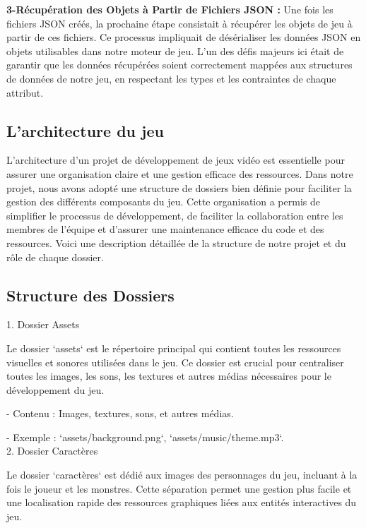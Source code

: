 \textbf{3-Récupération des Objets à Partir de Fichiers JSON :}
Une fois les fichiers JSON créés, la prochaine étape consistait à récupérer les objets de jeu à partir de ces fichiers. 
Ce processus impliquait de désérialiser les données JSON en objets utilisables dans notre moteur de jeu. 
L'un des défis majeurs ici était de garantir que les données récupérées soient correctement mappées aux structures de
données de notre jeu, en respectant les types et les contraintes de chaque attribut.


\subsection{L'architecture du jeu}




L'architecture d'un projet de développement de jeux vidéo est essentielle pour assurer une organisation claire et une gestion efficace des ressources.
 Dans notre projet, nous avons adopté une structure de dossiers bien définie pour faciliter la gestion des différents composants du jeu. Cette organisation 
 a permis de simplifier le processus de développement, de faciliter la collaboration entre les membres de l'équipe et d'assurer une maintenance efficace du code
  et des ressources. Voici une description détaillée de la structure de notre projet et du rôle de chaque dossier.

\subsection*{Structure des Dossiers}

1. Dossier Assets

   Le dossier `assets` est le répertoire principal qui contient toutes les ressources visuelles et sonores utilisées dans le jeu. 
   Ce dossier est crucial pour centraliser toutes les images, les sons, les textures et autres médias nécessaires pour le développement du jeu.

   - Contenu : Images, textures, sons, et autres médias.

   - Exemple : `assets/background.png`, `assets/music/theme.mp3`.
\\

2. Dossier Caractères

   Le dossier `caractères` est dédié aux images des personnages du jeu, incluant à la fois le joueur et les monstres.
    Cette séparation permet une gestion plus facile et une localisation rapide des ressources graphiques liées aux entités interactives du jeu.
   
